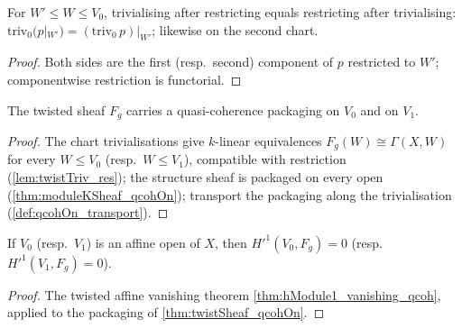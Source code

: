 \begin{lemma}
  \label{lem:twistTriv_res}
  \leanok
  For \(W' \le W \le V_0\), trivialising after restricting equals restricting after
  trivialising: \(\mathrm{triv}_0(p|_{W'}) = (\mathrm{triv}_0\, p)|_{W'}\); likewise on
  the second chart.
\end{lemma}
\begin{proof}
  \leanok
  Both sides are the first (resp.\ second) component of \(p\) restricted to \(W'\);
  componentwise restriction is functorial.
\end{proof}

\begin{theorem}
  \label{thm:twistSheaf_qcohOn}
  \leanok
  The twisted sheaf \(F_g\) carries a quasi-coherence packaging on \(V_0\) and on
  \(V_1\).
\end{theorem}
\begin{proof}
  \leanok
  The chart trivialisations give \(k\)-linear equivalences
  \(F_g(W) \cong \Gamma(X, W)\) for every \(W \le V_0\) (resp.\ \(W \le V_1\)),
  compatible with restriction (\ref{lem:twistTriv_res}); the structure sheaf is packaged
  on every open (\ref{thm:moduleKSheaf_qcohOn}); transport the packaging along the
  trivialisation (\ref{def:qcohOn_transport}).
\end{proof}

\begin{theorem}
  \label{thm:twistSheaf_affine_vanishing}
  \leanok
  If \(V_0\) (resp.\ \(V_1\)) is an affine open of \(X\), then
  \(H'^1(V_0, F_g) = 0\) (resp.\ \(H'^1(V_1, F_g) = 0\)).
\end{theorem}
\begin{proof}
  \leanok
  The twisted affine vanishing theorem \ref{thm:hModule1_vanishing_qcoh}, applied to the
  packaging of \ref{thm:twistSheaf_qcohOn}.
\end{proof}

